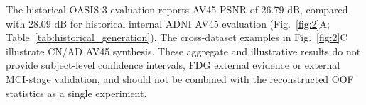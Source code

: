 The historical OASIS-3 evaluation reports AV45 PSNR of 26.79 dB, compared with 28.09 dB for historical internal ADNI AV45 evaluation (Fig.~\ref{fig:2}A; Table~\ref{tab:historical_generation}). The cross-dataset examples in Fig.~\ref{fig:2}C illustrate CN/AD AV45 synthesis. These aggregate and illustrative results do not provide subject-level confidence intervals, FDG external evidence or external MCI-stage validation, and should not be combined with the reconstructed OOF statistics as a single experiment.
